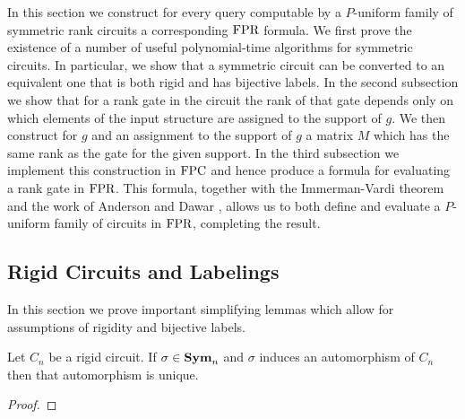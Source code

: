 \documentclass[../paper.tex]{subfiles}
\begin{document}
In this section we construct for every query computable by a $P$-uniform family of symmetric rank circuits a corresponding $\text{\upshape FPR}$ formula. We first prove the existence of a number of useful polynomial-time algorithms for symmetric circuits. In particular, we show that a symmetric circuit can be converted to an equivalent one that is both rigid and has bijective labels. In the second subsection we show that for a rank gate in the circuit the rank of that gate depends only on which elements of the input structure are assigned to the support of $g$. We then construct for  $g$ and an assignment to the support of $g$ a matrix $M$ which has the same rank as the gate for the given support. In the third subsection we implement this construction in $\text{\upshape FPC}$ and hence produce a formula for evaluating a rank gate in $\text{\upshape FPR}$. This formula, together with the Immerman-Vardi theorem and the work of Anderson and Dawar \cite{AndersonD17}, allows us to both define and evaluate a $P$-uniform family of circuits in $\text{\upshape FPR}$, completing the result.


\subsection{Rigid Circuits and Labelings}

In this section we prove important simplifying lemmas which allow for
assumptions of rigidity and bijective labels.


\begin{lem}
Let $C_n$ be a rigid circuit. If $\sigma \in \text{\textbf{Sym}}_n$ and $\sigma$ induces an automorphism of $C_n$ then that automorphism is unique. 
\end{lem}
\begin{proof}

\end{proof}
\end{document}
